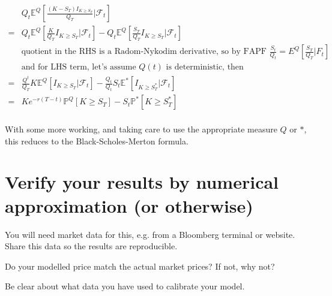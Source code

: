 \documentclass[a4paper]{article}
\begin{document}
\begin{align*}
& Q_t \mathbb{E}^Q[ \frac{  (K - S_T) I_{K \geq S_T} } { Q_T } | \mathcal{F}_t ] \\
= & Q_t \mathbb{E}^Q[ \frac{K} {Q_T} I_{K \geq S_T} | \mathcal{F}_t ] - Q_t \mathbb{E}^Q[ \frac{S_T} {Q_T} I_{K \geq S_T} | \mathcal{F}_t ] \\
& \text{quotient in the RHS is a Radom-Nykodim derivative, so by FAPF $\frac{S_t}{Q_t} = E^Q[\frac{S_T}{Q_T} | F_t]$} \\
& \text{and for LHS term, let's assume $Q(t)$ is deterministic, then} \\
= & \frac{Q^t} {Q_T} K \mathbb{E}^Q[  I_{K \geq S_T} | \mathcal{F}_t ] - \frac{Q_t}{Q_t} S_t \mathbb{E}^{*}[  I_{K \geq S^*_T} | \mathcal{F}_t ] \\
= & K e^{-r(T-t)} \mathbb{P}^Q[K \geq S_T] - S_t \mathbb{P}^{*}[K \geq S^*_T] \\
\end{align*}

With some more working, and taking care to use the appropriate measure $Q$ or $*$, this reduces to the Black-Scholes-Merton formula.

\section{Verify your results by numerical approximation (or otherwise)}

You will need market data for this, e.g. from a Bloomberg terminal or website. Share this data so the results are reproducible.

Do your modelled price match the actual market prices? If not, why not?

Be clear about what data you have used to calibrate your model.
\end{document}
